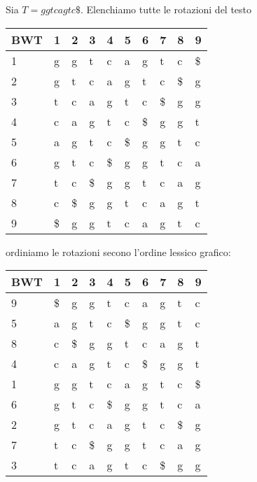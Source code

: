 \begin{esempio}
    Sia $T = ggtcagtc\$$. Elenchiamo tutte le rotazioni del testo

    \begin{table}[!ht]
        \centering
        \begin{tabular}{|l|l|l|l|l|l|l|l|l|l|}
            \hline
            BWT & 1  & 2  & 3  & 4  & 5  & 6  & 7  & 8  & 9  \\ \hline
            1   & g  & g  & t  & c  & a  & g  & t  & c  & \$ \\ \hline
            2   & g  & t  & c  & a  & g  & t  & c  & \$ & g  \\ \hline
            3   & t  & c  & a  & g  & t  & c  & \$ & g  & g  \\ \hline
            4   & c  & a  & g  & t  & c  & \$ & g  & g  & t  \\ \hline
            5   & a  & g  & t  & c  & \$ & g  & g  & t  & c  \\ \hline
            6   & g  & t  & c  & \$ & g  & g  & t  & c  & a  \\ \hline
            7   & t  & c  & \$ & g  & g  & t  & c  & a  & g  \\ \hline
            8   & c  & \$ & g  & g  & t  & c  & a  & g  & t  \\ \hline
            9   & \$ & g  & g  & t  & c  & a  & g  & t  & c  \\ \hline
        \end{tabular}
    \end{table}

    ordiniamo le rotazioni secono l'ordine lessico grafico:

    \begin{table}[!ht]
        \centering
        \begin{tabular}{|l|l|l|l|l|l|l|l|l|l|}
            \hline
            BWT & 1  & 2  & 3  & 4  & 5  & 6  & 7  & 8  & 9  \\ \hline
            9   & \$ & g  & g  & t  & c  & a  & g  & t  & c  \\ \hline
            5   & a  & g  & t  & c  & \$ & g  & g  & t  & c  \\ \hline
            8   & c  & \$ & g  & g  & t  & c  & a  & g  & t  \\ \hline
            4   & c  & a  & g  & t  & c  & \$ & g  & g  & t  \\ \hline
            1   & g  & g  & t  & c  & a  & g  & t  & c  & \$ \\ \hline
            6   & g  & t  & c  & \$ & g  & g  & t  & c  & a  \\ \hline
            2   & g  & t  & c  & a  & g  & t  & c  & \$ & g  \\ \hline
            7   & t  & c  & \$ & g  & g  & t  & c  & a  & g  \\ \hline
            3   & t  & c  & a  & g  & t  & c  & \$ & g  & g  \\ \hline
        \end{tabular}
    \end{table}


\end{esempio}

